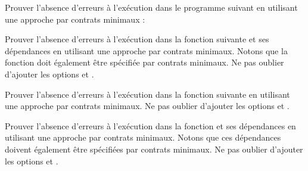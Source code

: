 



Prouver l'absence d'erreurs à l'exécution dans le programme suivant en utilisant
une approche par contrats minimaux :






Prouver l'absence d'erreurs à l'exécution dans la fonction 
suivante et ses dépendances en utilisant une approche par contrats minimaux.
Notons que la fonction  doit également être spécifiée par
contrats minimaux. Ne pas oublier d'ajouter les options
 et .







Prouver l'absence d'erreurs à l'exécution dans la fonction 
suivante en utilisant une approche par contrats minimaux. Ne pas oublier d'ajouter
les options  et
.






Prouver l'absence d'erreurs à l'exécution dans la fonction 
et ses dépendances en utilisant une approche par contrats minimaux. Notons que
ces dépendances doivent également être spécifiées par contrats minimaux. Ne pas
oublier d'ajouter les options  et
.



